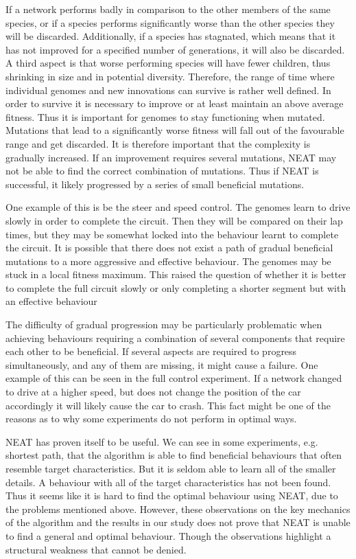 If a network performs badly in comparison to the other members of the same species, or if a species performs significantly worse than the other species they will be discarded\cite{stanley:neat}. Additionally, if a species has stagnated, which means that it has not improved for a specified number of generations, it will also be discarded. A third aspect is that worse performing species will have fewer children, thus shrinking in size and in potential diversity. Therefore, the range of time where individual genomes and new innovations can survive is rather well defined. In order to survive it is necessary to improve or at least maintain an above average fitness. Thus it is important for genomes to stay functioning when mutated. Mutations that lead to a significantly worse fitness will fall out of the favourable range and get discarded. It is therefore important that the complexity is gradually increased. If an improvement requires several mutations, NEAT may not be able to find the correct combination of mutations. Thus if NEAT is successful, it likely progressed by a series of small beneficial mutations. 

One example of this is be the steer and speed control. The genomes learn to drive slowly in order to complete the circuit. Then they will be compared on their lap times, but they may be somewhat locked into the behaviour learnt to complete the circuit. It is possible that there does not exist a path of gradual beneficial mutations to a more aggressive and effective behaviour. The genomes may be stuck in a local fitness maximum. This raised the question of whether it is better to complete the full circuit slowly or only completing a shorter segment but with an effective behaviour

The difficulty of gradual progression may be particularly problematic when achieving behaviours requiring a combination of several components that require each other to be beneficial. If several aspects are required to progress simultaneously, and any of them are missing, it might cause a failure. One example of this can be seen in the full control experiment. If a network changed to drive at a higher speed, but does not change the position of the car accordingly it will likely cause the car to crash. This fact might be one of the reasons as to why some experiments do not perform in optimal ways.

NEAT has proven itself to be useful. We can see in some experiments, e.g. shortest path, that the algorithm is able to find beneficial behaviours that often resemble target characteristics. But it is seldom able to learn all of the smaller details. A behaviour with all of the target characteristics has not been found. Thus it seems like it is hard to find the optimal behaviour using NEAT, due to the problems mentioned above. However, these observations on the key mechanics of the algorithm and the results in our study does not prove that NEAT is unable to find a general and optimal behaviour. Though the observations highlight a structural weakness that cannot be denied. 

